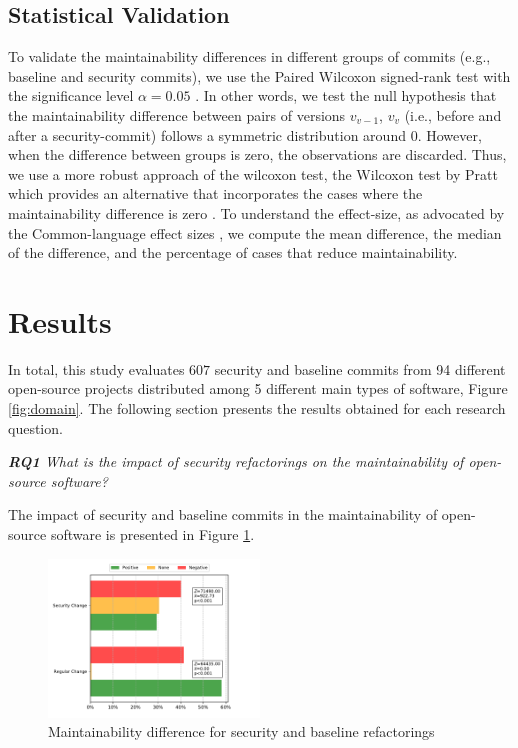 \documentclass[10pt,conference]{IEEEtran}
\begin{document}
\subsection{Statistical Validation}\label{sec:statsval}
%
To validate the maintainability differences in different groups of commits
(e.g., baseline and security commits), we use the Paired Wilcoxon signed-rank
test with the significance level $\alpha = 0.05$ \cite{10.2307/3001968} . In
other words, we test the null hypothesis that the maintainability difference
between pairs of versions $v_{v-1}$, $v_v$ (i.e., before and after a
security-commit) follows a symmetric distribution around $0$. However, when the
difference between groups is zero, the observations are discarded. Thus, we use
a more robust approach of the wilcoxon test, the Wilcoxon test by Pratt which
provides an alternative that incorporates the cases where the maintainability
difference is zero \cite{10.2307/2282543}. To understand the effect-size, as
advocated by the Common-language effect sizes \cite{graw:1992}, we compute the
mean difference, the median of the difference, and the percentage of cases that
reduce maintainability.
%
\section{Results}\label{sec:results}

In total, this study evaluates $607$ security and baseline commits from 94 different open-source projects distributed among 5 different main types of software, Figure \ref{fig:domain}. The following section presents the results obtained for each research question.

\begin{framed}
\textit{\textbf{RQ1} What is the impact of security refactorings on the maintainability of open-source software?}
\end{framed}

The impact of security and baseline commits in the maintainability of open-source software is presented in Figure \ref{fig:secvsreg}. 

\begin{figure}[h]
 	\centering 	\includegraphics[width=0.5\textwidth]{figures/maintainability.pdf}
 	\caption{Maintainability difference for security and baseline refactorings}
	\label{fig:secvsreg}
\end{figure}
\end{document}
